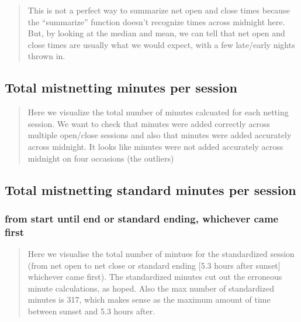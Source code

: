 \documentclass[
]{article}
\begin{document}
\begin{quote}
This is not a perfect way to summarize net open and close times because
the ``summarize'' function doesn't recognize times across midnight here.
But, by looking at the median and mean, we can tell that net open and
close times are usually what we would expect, with a few late/early
nights thrown in.
\end{quote}

\hypertarget{total-mistnetting-minutes-per-session}{%
\subsection{Total mistnetting minutes per
session}\label{total-mistnetting-minutes-per-session}}

\begin{quote}
Here we visualize the total number of minutes calcuated for each netting
session. We want to check that minutes were added correctly across
multiple open/close sessions and also that minutes were added accurately
across midnight. It looks like minutes were not added accurately across
midnight on four occasions (the outliers)
\end{quote}

\hypertarget{total-mistnetting-standard-minutes-per-session}{%
\subsection{Total mistnetting standard minutes per
session}\label{total-mistnetting-standard-minutes-per-session}}

\hypertarget{from-start-until-end-or-standard-ending-whichever-came-first}{%
\subsubsection{from start until end or standard ending, whichever came
first}\label{from-start-until-end-or-standard-ending-whichever-came-first}}

\begin{quote}
Here we visualise the total number of mintues for the standardized
session (from net open to net close or standard ending {[}5.3 hours
after sunset{]} whichever came first). The standardized minutes cut out
the erroneous minute calculations, as hoped. Also the max number of
standardized minutes is 317, which makes sense as the maximum amount of
time between sunset and 5.3 hours after.
\end{quote}
\end{document}
